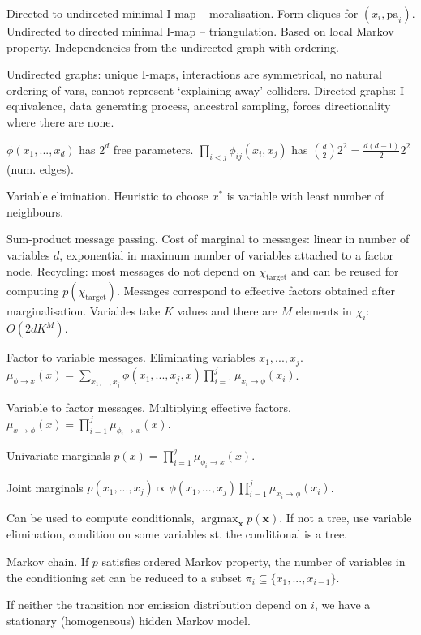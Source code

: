 \documentclass[twocolumn]{article}
\DeclareMathOperator*{\argmax}{argmax}
\begin{document}
Directed to undirected minimal I-map -- moralisation. Form cliques for $(x_i,\text{pa}_i)$. Undirected to directed minimal I-map -- triangulation. Based on local Markov property. Independencies from the undirected graph with ordering.

Undirected graphs: unique I-maps, interactions are symmetrical, no natural ordering of vars, cannot represent `explaining away' colliders. Directed graphs: I-equivalence, data generating process, ancestral sampling, forces directionality where there are none.

$\phi(x_1,...,x_d)$ has $2^d$ free parameters. $\prod_{i<j}\phi_{ij}(x_i,x_j)$ has $\binom{d}{2}2^2=\frac{d(d-1)}{2}2^2$ (num. edges).

Variable elimination. Heuristic to choose $x^*$ is variable with least number of neighbours.

Sum-product message passing. Cost of marginal to messages: linear in number of variables $d$, exponential in maximum number of variables attached to a factor node. Recycling: most messages do not depend on $\chi_\text{target}$ and can be reused for computing $p(\chi_\text{target})$. Messages correspond to effective factors obtained after marginalisation. Variables take $K$ values and there are $M$ elements in $\chi_i$: $O(2dK^M)$.

Factor to variable messages. Eliminating variables $x_1,...,x_j$.\\
$\mu_{\phi\to x}(x)=\sum_{x_1,...,x_j}\phi(x_1,...,x_j,x)\prod_{i=1}^j \mu_{x_i\to\phi}(x_i)$.

Variable to factor messages. Multiplying effective factors.\\
$\mu_{x\to\phi}(x)=\prod_{i=1}^j\mu_{\phi_i\to x}(x)$.

Univariate marginals $p(x)=\prod_{i=1}^j\mu_{\phi_i\to x}(x)$.

Joint marginals $p(x_1,...,x_j)\propto\phi(x_1,...,x_j)\prod_{i=1}^j\mu_{x_i\to\phi}(x_i)$.

Can be used to compute conditionals, $\argmax_\mathbf{x} p(\mathbf{x})$. If not a tree, use variable elimination, condition on some variables st. the conditional is a tree.

Markov chain. If $p$ satisfies ordered Markov property, the number of variables in the conditioning set can be reduced to a subset $\pi_i\subseteq\{x_1,...,x_{i-1}\}$.

If neither the transition nor emission distribution depend on $i$, we have a stationary (homogeneous) hidden Markov model.
\end{document}
